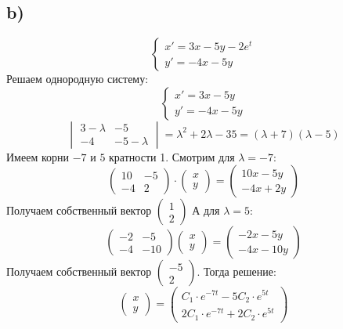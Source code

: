 \documentclass[a4paper,12pt]{article}
\begin{document}
\subsection*{b)}
\[
\begin{cases}
x' = 3x -5y - 2e^t \\
y' = -4x - 5y
\end{cases}
\]
Решаем однородную систему:
\[
\begin{cases}
x' = 3x -5y\\
y' = -4x - 5y
\end{cases}
\]
\[
\begin{vmatrix}
3 - \lambda & -5 \\
-4 & -5 - \lambda
\end{vmatrix}
=\lambda^2 + 2\lambda -35 = (\lambda+ 7)(\lambda-5)
\]
Имеем корни $-7$ и $5$ кратности 1. Смотрим для $\lambda = -7$:
\[
\begin{pmatrix}
10 & -5 \\
-4 & 2 
\end{pmatrix}
\cdot
\begin{pmatrix}
x \\ y
\end{pmatrix}
=
\begin{pmatrix}
10x-5y \\
-4x+2y
\end{pmatrix}
\]
Получаем собственный вектор $\begin{pmatrix} 
1 \\ 2
\end{pmatrix}$ А для $\lambda = 5$:
\[
\begin{pmatrix}
-2 & -5 \\
-4 & -10
\end{pmatrix}
\begin{pmatrix}
x \\ y
\end{pmatrix}
=
\left(\begin{matrix}
-2x-5y \\
-4x-10y
\end{matrix}\right)
\]
Получаем собственный вектор $\begin{pmatrix} 
-5 \\ 2
\end{pmatrix}$. Тогда решение:
\[
\begin{pmatrix}
x \\ y
\end{pmatrix}
=
\begin{pmatrix}
C_1 \cdot e^{-7t} - 5C_2 \cdot e^{5t} \\
2C_1 \cdot e^{-7t} + 2C_2 \cdot e^{5t}
\end{pmatrix}
\]
\end{document}

